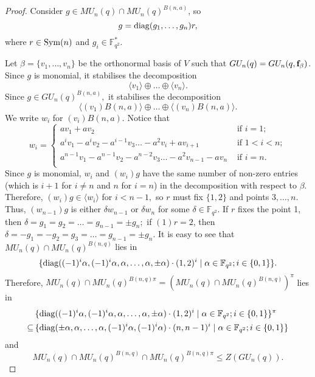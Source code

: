 \begin{proof}

Consider $g \in MU_n(q) \cap MU_n(q)^{B(n,a)}$,  so 
\begin{equation*}
g=\mathrm{diag}(g_1, \ldots, g_n)r,
\end{equation*}
where $r \in \mathrm{Sym}(n)$ and $g_i \in \mathbb{F}_{q^2}^{*}$. %

Let $\beta=\{v_1, \ldots, v_n\}$ be the orthonormal basis of $V$ such that $GU_n(q)=GU_n(q, {\bf f}_{\beta})$. Since $g$ is monomial, it stabilises the decomposition
$$\langle v_1\rangle \oplus \ldots \oplus \langle v_n \rangle.$$ Since $g \in GU_n(q)^{B(n,a)},$ it stabilises the decomposition 
$$\langle (v_1)B(n,a)\rangle \oplus \ldots \oplus \langle (v_n) B(n,a) \rangle.$$ We write $w_i$ for $(v_i)B(n,a).$ Notice that 
\begin{equation*}
w_i=
\begin{cases}
av_1 +a v_2 & \text{ if } i=1; \\
a^{i}v_1  -a^{i}v_2  -a^{i-1}v_3  \ldots   -a^2v_i + av_{i+1} & \text{ if } 1<i<n; \\
a^{n-1}v_1  -a^{n-1}v_2  -a^{n-2}v_3  \ldots   -a^2v_{n-1} - av_{n} & \text{ if } i=n.\\          
\end{cases}
\end{equation*}
Since $g$ is monomial, $w_i$ and $(w_i)g$ have the same number of non-zero entries (which is $i+1$ for $i \ne n$ and $n$ for $i=n$) in the decomposition with respect to $\beta.$ Therefore, $(w_i)g \in \langle w_i \rangle$ for $i <n-1,$ so $r$ must fix $\{1,2\}$ and points $3, \ldots, n.$  
Thus, $(w_{n-1})g$ is either $ \delta w_{n-1}$ or $\delta w_{n}$ for some $\delta \in \mathbb{F}_{q^2}.$ If $r$ fixes the point 1, then  $\delta=g_1=g_2= \ldots =g_{n-1}= \pm g_n;$ if $(1)r=2$, then 
$\delta=-g_1=-g_2=g_3= \ldots =g_{n-1}= \pm g_n.$  It is easy to see that $MU_n(q) \cap MU_n(q)^{B(n,q)}$  lies in 
\begin{equation*}
\begin{split}
\{ \mathrm{diag}((-1)^i \alpha,(-1)^i \alpha,\alpha, \ldots,\alpha, \pm \alpha) \cdot (1,2)^i \mid \alpha \in \mathbb{F}_{q^2};  i \in \{0,1\}\}.
\end{split}
\end{equation*}
Therefore, $MU_n(q) \cap MU_n(q)^{B(n,q)\pi}  =  (MU_n(q) \cap MU_n(q)^{B(n,q)})^{\pi}$ lies in 
\begin{equation*}
\begin{aligned}
 & \,   \{ \mathrm{diag}((-1)^i \alpha,(-1)^i \alpha,\alpha, \ldots,\alpha, \pm \alpha) \cdot (1,2)^i\mid \alpha \in \mathbb{F}_{q^2};  i \in \{0,1\}\}^{\pi} \\
 \subseteq & \, \{ \mathrm{diag}(\pm \alpha,\alpha, \ldots,\alpha,  (-1)^i \alpha,(-1)^i \alpha) \cdot (n,n-1)^i\mid \alpha \in \mathbb{F}_{q^2};  i \in \{0,1\}\}
\end{aligned}
\end{equation*} 
and $$MU_n(q) \cap MU_n(q)^{B(n,q)} \cap MU_n(q)^{B(n,q)\pi}\le Z(GU_n(q)).$$



\end{proof}
